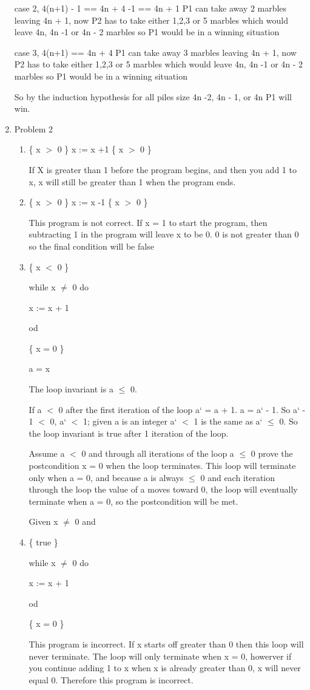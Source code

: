 \documentclass[10pt]{article}
\begin{document}
\begin{enumerate}
	case 2, 4(n+1) - 1 == 4n + 4 -1 == 4n + 1 P1 can take away 2 marbles leaving 4n + 1, now P2 has to take either 1,2,3 or 5 marbles which would leave 4n, 4n -1 or 4n - 2 marbles so P1 would be in a winning situation
	
	case 3,  4(n+1)  == 4n + 4  P1 can take away 3  marbles leaving 4n + 1, now P2 has to take either 1,2,3 or 5 marbles which would leave 4n, 4n -1 or 4n - 2 marbles so P1 would be in a winning situation

So by the induction hypothesis for all piles size 4n -2, 4n - 1, or 4n P1 will win.

\item Problem 2
\begin{enumerate}
\item  \{ x  $ > $ 0 \}  x := x +1 \{ x $ > $ 0 \}

If X is greater than 1 before the program begins, and then you add 1 to x, x will still be greater than 1 when the program ends.

\item \{ x $ > $ 0 \} x := x -1 \{ x $ > $ 0 \}

This program is not correct.  If x = 1 to start the program, then subtracting 1 in the program will leave x to be 0.  0 is not greater than 0 so the final condition will be false

\item \{ x $ < $ 0 \} 

	while x $ \neq $ 0 do

	x := x + 1

	od

	\{ x = 0 \}

	a = x

The loop invariant is a $ \leq $ 0.  

If a $ < $ 0 after the first iteration of the loop a` = a + 1.  a = a` - 1. So a` - 1 $<$ 0, a` $<$ 1; given a is an integer a` $<$ 1 is the same as a` $\leq $ 0.  So the loop invariant is true after 1 iteration of the loop.

Assume a $ < $ 0 and through all iterations of the loop a $ \leq $ 0 prove the postcondition x = 0 when the loop terminates.  This loop will terminate only when a = 0, and because a is always $ \leq $ 0 and each iteration through the loop the value of a moves toward 0, the loop will eventually terminate when a = 0, so the postcondition will be met.    

Given x $ \neq $ 0 and 
\item \{ true \} 

	while x $ \neq $ 0 do

	x := x + 1

	od

	\{ x = 0 \}

This program is incorrect.  If x starts off greater than 0 then this loop will never terminate.  The loop will only terminate when x = 0, howerver if you continue adding 1 to x when x is already greater than 0, x will never equal 0.  Therefore this program is incorrect.
\end{enumerate}

\end{enumerate}
\end{document}
